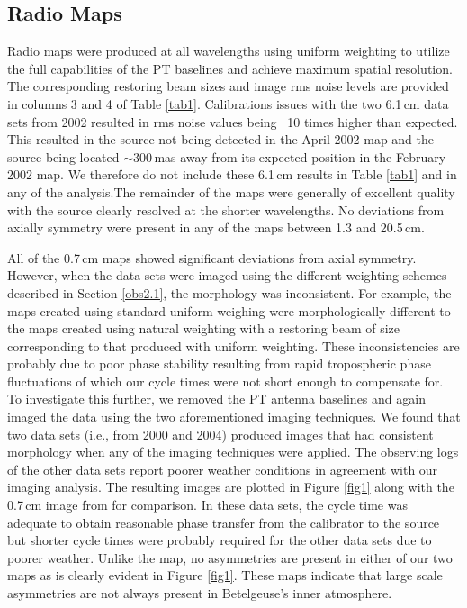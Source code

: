 \documentclass[iop]{emulateapj}
\begin{document}
\subsection{Radio Maps}
Radio maps were produced at all wavelengths using uniform weighting to utilize the full capabilities of the PT baselines and achieve maximum spatial resolution. The corresponding restoring beam sizes and image rms noise levels are provided in columns 3 and 4 of Table \ref{tab1}. Calibrations issues with the two 6.1\,cm data sets from 2002 resulted in rms noise values being ~10 times higher than expected. This resulted in the source not being detected in the April 2002 map and the source being located $\sim 300$\,mas away from its expected position in the February 2002 map. We therefore do not include these 6.1\,cm results in Table \ref{tab1} and in any of the analysis.The remainder of the maps were generally of excellent quality with the source clearly resolved at the shorter wavelengths. No deviations from axially symmetry were present in any of the maps between 1.3 and 20.5\,cm.

All of the 0.7\,cm maps showed significant deviations from axial symmetry. However, when the data sets were imaged using the different weighting schemes described in Section \ref{obs2.1}, the morphology was inconsistent. For example, the maps created using standard uniform weighing were morphologically different to the maps created using natural weighting with a restoring beam of size corresponding to that produced with uniform weighting. These inconsistencies are probably due to poor phase stability resulting from rapid tropospheric phase fluctuations of which our cycle times were not short enough to compensate for. To investigate this further, we removed the PT antenna baselines and again imaged the data using the two aforementioned
imaging techniques. We found that two data sets (i.e., from 2000 and 2004) produced images that had consistent morphology when any of the imaging techniques were applied. The observing logs of the other data sets report poorer weather conditions in agreement with our imaging analysis. The resulting images are plotted in Figure \ref{fig1} along with the 0.7\,cm image from \cite{lim_1998} for comparison. In these data sets, the cycle time was adequate to obtain reasonable phase transfer from the calibrator to the source but shorter cycle times were probably required for the other data sets due to poorer weather. Unlike the \cite{lim_1998} map, no asymmetries are present in either of our two maps as is clearly evident in Figure \ref{fig1}. These maps indicate that large scale asymmetries are not always present in Betelgeuse's inner atmosphere.
\end{document}
